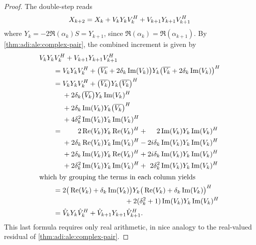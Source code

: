 \begin{proof}
  The double-step reads
  \begin{equation*}
    X_{k+2} = X_k
    + V_k Y_k V_k^H
    + V_{k+1} Y_{k+1} V_{k+1}^H
  \end{equation*}
  where $Y_k = -2 \Re(\alpha_k) S = Y_{k+1}$,
  since $\Re(\alpha_k) = \Re(\alpha_{k+1})$.
  By \autoref{thm:adi:ale:complex-pair},
  the combined increment is given by
  \begin{align*}
    \MoveEqLeft
    V_k Y_k V_k^\HT + V_{k+1} Y_{k+1} V_{k+1}^\HT
    \\
    &= V_k Y_k V_k^\HT +
    \big( \conj{V_k} + 2\delta_k \Im(V_k) \big)
    Y_k
    \big( \conj{V_k} + 2\delta_k \Im(V_k) \big)^\HT
    \\
    &= \begin{aligned}[t]
      & V_k Y_k V_k^\HT + \big( \conj{V_k} \big) Y_k \big( \conj{V_k} \big)^\HT \\
      & + 2\delta_k \big( \conj{V_k} \big) Y_k \Im(V_k)^\HT \\
      & + 2\delta_k \Im(V_k) Y_k \big( \conj{V_k} \big)^\HT \\
      & + 4\delta_k^2 \Im(V_k) Y_k \Im(V_k)^\HT
    \end{aligned}
    \\
    &= \begin{alignedat}[t]{4}
      &&                 2 \Re(V_k) & Y_k \Re(V_k)^\HT &
      &{}+{}&            2 \Im(V_k) & Y_k \Im(V_k)^\HT
      \\
      &{}+{}&    2\delta_k \Re(V_k) & Y_k \Im(V_k)^\HT &
      &{}-{}& 2\im\delta_k \Im(V_k) & Y_k \Im(V_k)^\HT
      \\
      &{}+{}&    2\delta_k \Im(V_k) & Y_k \Re(V_k)^\HT &
      &{}+{}& 2\im\delta_k \Im(V_k) & Y_k \Im(V_k)^\HT
      \\
      &{}+{}&  2\delta_k^2 \Im(V_k) & Y_k \Im(V_k)^\HT &
      &{}+{}&  2\delta_k^2 \Im(V_k) & Y_k \Im(V_k)^\HT
    \end{alignedat}
    \\
\intertext{which by grouping the terms in each column yields}
    &= \begin{multlined}[t]
      2 \big( \Re(V_k) + \delta_k \Im(V_k) \big)
      Y_k \big( \Re(V_k) + \delta_k \Im(V_k) \big)^\HT
      \\
      + 2(\delta_k^2 + 1) \Im(V_k) Y_k \Im(V_k)^\HT
    \end{multlined}
    \\
    &= \hat V_k Y_k \hat V_k^\HT
    + \hat V_{k+1} Y_{k+1} \hat V_{k+1}^\HT
    .
  \end{align*}
  This last formula requires only real arithmetic,
  in nice analogy to the real-valued residual of \autoref{thm:adi:ale:complex-pair}.
\end{proof}


